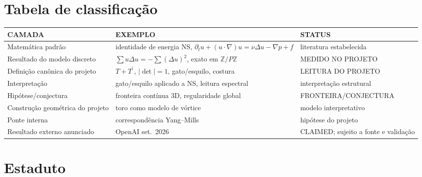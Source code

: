 \documentclass[11pt,a4paper]{article}
\newcommand\dg{^{\dagger}}
\begin{document}
\section{Tabela de classificação}\label{sec:tabela}

\begin{center}\small
\begin{tabular}{p{}p{}p{}}
\toprule
CAMADA & EXEMPLO & STATUS \\
\midrule
Matemática padrão & identidade de energia NS,
  $\partial_t u+(u\cdot\nabla)u=\nu\Delta u-\nabla p+f$ &
  literatura estabelecida \\
Resultado do modelo discreto &
  $\sum u\Delta u=-\sum(\Delta u)^2$, exato em $\mathbb Z/P\mathbb Z$ &
  MEDIDO NO PROJETO \\
Definição canônica do projeto &
  $T+T^{\dg}$, $|\det|=1$, gato/esquilo, costura &
  LEITURA DO PROJETO \\
Interpretação &
  gato/esquilo aplicado a NS, leitura espectral &
  interpretação estrutural \\
Hipótese/conjectura &
  fronteira contínua 3D, regularidade global &
  FRONTEIRA/CONJECTURA \\
Construção geométrica do projeto &
  toro como modelo de vórtice &
  modelo interpretativo \\
Ponte interna &
  correspondência Yang--Mills &
  hipótese do projeto \\
Resultado externo anunciado &
  OpenAI set.~2026 &
  CLAIMED; sujeito a fonte e validação \\
\bottomrule
\end{tabular}
\end{center}

\section{Estaduto}\label{sec:estaduto}
\end{document}
